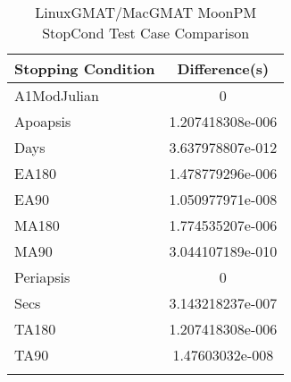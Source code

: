 \begin{table}[htbp!]
\centering
\caption{ LinuxGMAT/MacGMAT MoonPM StopCond Test Case Comparison}
      \begin{tabular}{lc}
      \hline\hline
          Stopping Condition & Difference(s) \\
         \hline
         A1ModJulian & 0 \\
         Apoapsis & 1.207418308e-006 \\
         Days & 3.637978807e-012 \\
         EA180 & 1.478779296e-006 \\
         EA90 & 1.050977971e-008 \\
         MA180 & 1.774535207e-006 \\
         MA90 & 3.044107189e-010 \\
         Periapsis & 0 \\
         Secs & 3.143218237e-007 \\
         TA180 & 1.207418308e-006 \\
         TA90 & 1.47603032e-008 \\
      \hline\hline
      \label{Table: LinuxGMAT-MacGMAT MoonPM StopCond Table} 
\end{tabular}
\end{table}
